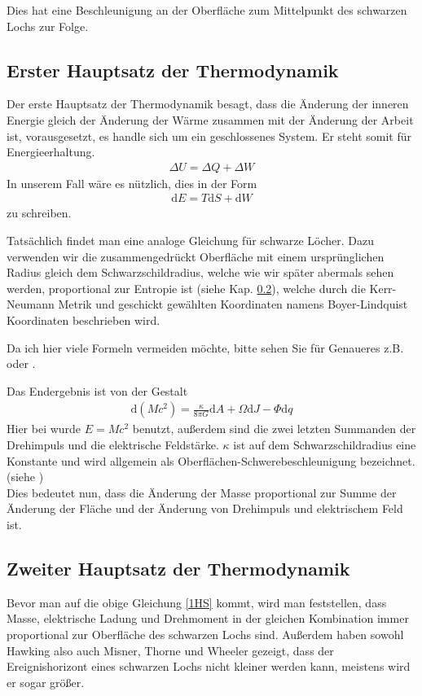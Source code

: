 \documentclass[ngerman]{scrartcl}
\newcommand{\diff}{\mathrm{d}}
\begin{document}
	Dies hat eine Beschleunigung an der Oberfläche zum Mittelpunkt des schwarzen Lochs zur Folge. 

	\subsection{Erster Hauptsatz der Thermodynamik}
	Der erste Hauptsatz der Thermodynamik besagt, dass die Änderung der inneren Energie gleich der Änderung der Wärme zusammen mit der Änderung der Arbeit ist, vorausgesetzt, es handle sich um ein geschlossenes System. Er steht somit für Energieerhaltung.
		\begin{align}
			\Delta U = \Delta Q + \Delta W
		\end{align}
	In unserem Fall wäre es nützlich, dies in der Form
		\begin{align}
			\diff E = T\diff S + \diff W
		\end{align}
	zu schreiben. 
	
	Tatsächlich findet man eine analoge Gleichung für schwarze Löcher.
	Dazu verwenden wir die zusammengedrückt Oberfläche mit einem ursprünglichen Radius gleich dem Schwarzschildradius, welche wie wir später abermals sehen werden, proportional zur Entropie ist (siehe Kap. \ref{zweiterHS}), welche durch die Kerr-Neumann Metrik und geschickt gewählten Koordinaten namens Boyer-Lindquist Koordinaten beschrieben wird. 
	
	Da ich hier viele Formeln vermeiden möchte, bitte sehen Sie für Genaueres z.B. \cite{BekensteinHawking} oder \cite{Gebhardt}.
	
	Das Endergebnis ist von der Gestalt
		\begin{align} \label{1HS}
			\diff (Mc^2) = \frac{\kappa}{8 \pi G} \diff A + \Omega \diff J - \Phi \diff q
		\end{align} 
	Hier bei wurde $E = Mc^2$ benutzt, außerdem sind die zwei letzten Summanden der Drehimpuls und die elektrische Feldstärke. $\kappa$ ist auf dem Schwarzschildradius eine Konstante und wird allgemein als Oberflächen-Schwerebeschleunigung bezeichnet. (siehe \cite{Gebhardt})
	\\
	
	Dies bedeutet nun, dass die Änderung der Masse proportional zur Summe der Änderung der Fläche und der Änderung von Drehimpuls und elektrischem Feld ist.

\subsection{Zweiter Hauptsatz der Thermodynamik} \label{zweiterHS}
	Bevor man auf die obige Gleichung \ref{1HS} kommt, wird man feststellen, dass Masse, elektrische Ladung und Drehmoment in der gleichen Kombination immer proportional zur Oberfläche des schwarzen Lochs sind. 
	Außerdem haben sowohl Hawking \cite{ParticleCreation} also auch Misner, Thorne und Wheeler \cite{MisnerThorneWheeler} gezeigt, dass der Ereignishorizont eines schwarzen Lochs nicht kleiner werden kann, meistens wird er sogar größer. 
	
\end{document}
